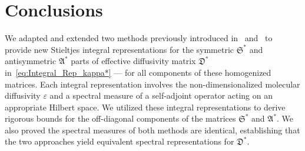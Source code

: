 \documentclass[english,12pt,jmp,graphicx]{revtex4-1}
\newcommand{\vecu}{\boldsymbol{u}}
\newcommand{\thmref}[1]{Theorem~\ref{#1}}
\newcommand{\secref}[1]{Section~\ref{#1}}
\newcommand{\Sg}{\mathfrak{S}}
\newcommand{\Ag}{\mathfrak{A}}
\newcommand{\Dg}{\mathfrak{D}}
\begin{document}
\section{Conclusions} \label{sec:Conclusions}
%
We adapted and extended two methods previously introduced
in~\cite{Avellaneda:PRL-753,Avellaneda:CMP-339}
and~\cite{Bhattacharya:AAP:1999:951,Bhattacharya:1989:ASD,Pavliotis:PHD_Thesis} to provide
new
Stieltjes integral representations for the symmetric $\Sg^*$ and
antisymmetric $\Ag^*$ parts of effective diffusivity matrix $\Dg^*$
in~\eqref{eq:Integral_Rep_kappa*}
--- for all components of these homogenized matrices. Each integral
representation involves the non-dimensionalized molecular diffusivity
$\varepsilon$ and a 
spectral measure of a self-adjoint operator acting on an
appropriate Hilbert space.
We utilized these integral representations to derive rigorous
bounds for the off-diagonal components of the matrices $\Sg^*$ and
$\Ag^*$. We also proved the spectral measures of both methods are
identical, establishing that the two approaches yield equivalent
spectral representations for $\Dg^*$.
\end{document}
